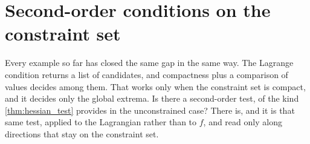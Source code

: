 
\section{Second-order conditions on the constraint set}
\label{sec:second_order_lagrange}

Every example so far has closed the same gap in the same way. The Lagrange condition returns a
list of candidates, and compactness plus a comparison of values decides among them. That works
only when the constraint set is compact, and it decides only the global extrema. Is there a
second-order test, of the kind \cref{thm:hessian_test} provides in the unconstrained case? There
is, and it is that same test, applied to the Lagrangian rather than to $f$, and read only along
directions that stay on the constraint set.

